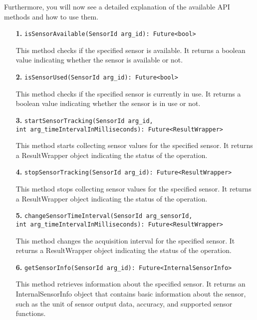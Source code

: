 \documentclass[12pt]{article}
\begin{document}
Furthermore, you will now see a detailed explanation of the available API methods and how to use them. 
\begin{itemize}
    \item[\textbf{1.}] \texttt{isSensorAvailable(SensorId arg\_id): Future<bool>}
    
    This method checks if the specified sensor is available. It returns a boolean value indicating whether the sensor is available or not.
    
    \item[\textbf{2.}] \texttt{isSensorUsed(SensorId arg\_id): Future<bool>}
    
    This method checks if the specified sensor is currently in use. It returns a boolean value indicating whether the sensor is in use or not.

    \item[\textbf{3.}] \texttt{startSensorTracking(SensorId arg\_id, \\ int arg\_timeIntervalInMilliseconds): Future<ResultWrapper>}
    
    This method starts collecting sensor values for the specified sensor. It returns a ResultWrapper object indicating the status of the operation.

    \item[\textbf{4.}] \texttt{stopSensorTracking(SensorId arg\_id): Future<ResultWrapper>}
    
    This method stops collecting sensor values for the specified sensor. It returns a ResultWrapper object indicating the status of the operation.

    \item[\textbf{5.}] \texttt{changeSensorTimeInterval(SensorId arg\_sensorId, \\ int arg\_timeIntervalInMilliseconds): Future<ResultWrapper>}
    
    This method changes the acquisition interval for the specified sensor. It returns a ResultWrapper object indicating the status of the operation.

    \item[\textbf{6.}] \texttt{getSensorInfo(SensorId arg\_id): Future<InternalSensorInfo>}
    
    This method retrieves information about the specified sensor. It returns an InternalSensorInfo object that contains basic information about the sensor, such as the unit of sensor output data, accuracy, and supported sensor functions.
\end{itemize}
\end{document}
